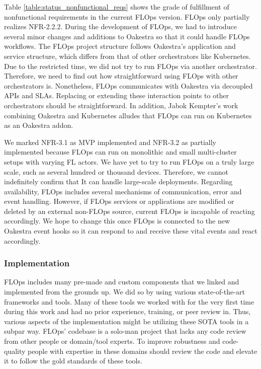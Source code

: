 Table \ref{table:status_nonfunctional_reqs} shows the grade of fulfillment of nonfunctional requirements in the current FLOps version.
FLOps only partially realizes NFR-2.2.2.
During the development of FLOps, we had to introduce several minor changes and additions to Oakestra so that it could handle FLOps workflows.
The FLOps project structure follows Oakestra's application and service structure, which differs from that of other orchestrators like Kubernetes.
Due to the restricted time, we did not try to run FLOps via another orchestrator.
Therefore, we need to find out how straightforward using FLOps with other orchestrators is.
Nonetheless, FLOps communicates with Oakestra via decoupled APIs and SLAs.
Replacing or extending these interaction points to other orchestrators should be straightforward.
In addition, Jabok Kempter's work combining Oakestra and Kubernetes \cite{thesis:tum_jakob_kempter_kubernetes_oakestra} alludes that FLOps can run on Kubernetes as an Oakestra addon.

We marked NFR-3.1 as MVP implemented and NFR-3.2 as partially implemented because FLOps can run on monolithic and small multi-cluster setups with varying FL actors.
We have yet to try to run FLOps on a truly large scale, such as several hundred or thousand devices.
Therefore, we cannot indefinitely confirm that It can handle large-scale deployments.
Regarding availability, FLOps includes several mechanisms of communication, error and event handling.
However, if FLOps services or applications are modified or deleted by an external non-FLOps source, current FLOps is incapable of reacting accordingly.
We hope to change this once FLOps is connected to the new Oakestra event hooks \cite{thesis:tum_mahmoud} so it can respond to and receive these vital events and react accordingly.


\subsubsection{Implementation}
FLOps includes many pre-made and custom components that we linked and implemented from the grounds up.
We did so by using various state-of-the-art frameworks and tools.
Many of these tools we worked with for the very first time during this work and had no prior experience, training, or peer review in.
Thus, various aspects of the implementation might be utilizing these SOTA tools in a subpar way.
FLOps' codebase is a solo-man project that lacks any code review from other people or domain/tool experts.
To improve robustness and code-quality people with expertise in these domains should review the code and elevate it to follow the gold standards of these tools.

